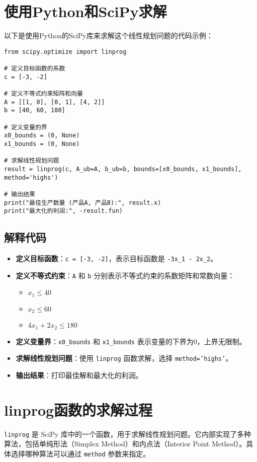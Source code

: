 \documentclass{article}
\begin{document}
\section{使用Python和SciPy求解}
以下是使用Python的SciPy库来求解这个线性规划问题的代码示例：

\begin{verbatim}
from scipy.optimize import linprog

# 定义目标函数的系数
c = [-3, -2]

# 定义不等式约束矩阵和向量
A = [[1, 0], [0, 1], [4, 2]]
b = [40, 60, 180]

# 定义变量的界
x0_bounds = (0, None)
x1_bounds = (0, None)

# 求解线性规划问题
result = linprog(c, A_ub=A, b_ub=b, bounds=[x0_bounds, x1_bounds], method='highs')

# 输出结果
print("最佳生产数量 (产品A, 产品B):", result.x)
print("最大化的利润:", -result.fun)
\end{verbatim}

\subsection{解释代码}
\begin{itemize}
    \item \textbf{定义目标函数}：\texttt{c = [-3, -2]}，表示目标函数是 \texttt{-3x\_1 - 2x\_2}。
    \item \textbf{定义不等式约束}：\texttt{A} 和 \texttt{b} 分别表示不等式约束的系数矩阵和常数向量：
    \begin{itemize}
        \item $x_1 \leq 40$
        \item $x_2 \leq 60$
        \item $4x_1 + 2x_2 \leq 180$
    \end{itemize}
    
    \item \textbf{定义变量界}：\texttt{x0\_bounds} 和 \texttt{x1\_bounds} 表示变量的下界为0，上界无限制。
    \item \textbf{求解线性规划问题}：使用 \texttt{linprog} 函数求解，选择 \texttt{method='highs'}。
    \item \textbf{输出结果}：打印最佳解和最大化的利润。
\end{itemize}


\section{linprog函数的求解过程}
\texttt{linprog} 是 SciPy 库中的一个函数，用于求解线性规划问题。它内部实现了多种算法，包括单纯形法（Simplex Method）和内点法（Interior Point Method）。具体选择哪种算法可以通过 \texttt{method} 参数来指定。
\end{document}
